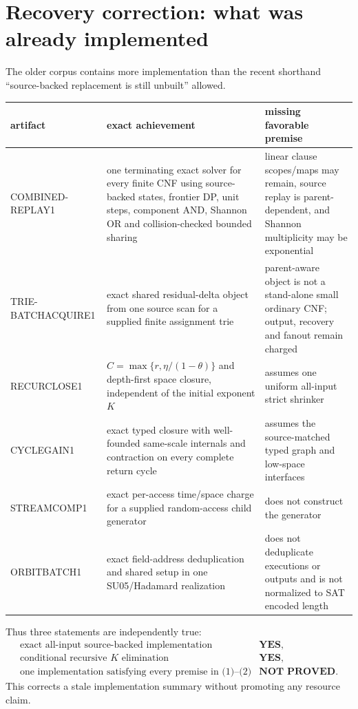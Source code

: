 \documentclass[11pt]{article}
\begin{document}
\section{Recovery correction: what was already implemented}
The older corpus contains more implementation than the recent shorthand
``source-backed replacement is still unbuilt'' allowed.

\begin{center}
\begin{tabular}{p{.25\linewidth}p{.31\linewidth}p{.35\linewidth}}
\toprule
artifact & exact achievement & missing favorable premise\\
\midrule
COMBINED-REPLAY1 & one terminating exact solver for every finite CNF using source-backed states, frontier DP, unit steps, component AND, Shannon OR and collision-checked bounded sharing & linear clause scopes/maps may remain, source replay is parent-dependent, and Shannon multiplicity may be exponential\\
TRIE-BATCHACQUIRE1 & exact shared residual-delta object from one source scan for a supplied finite assignment trie & parent-aware object is not a stand-alone small ordinary CNF; output, recovery and fanout remain charged\\
RECURCLOSE1 & $C=\max\{r,\eta/(1-\theta)\}$ and depth-first space closure, independent of the initial exponent $K$ & assumes one uniform all-input strict shrinker\\
CYCLEGAIN1 & exact typed closure with well-founded same-scale internals and contraction on every complete return cycle & assumes the source-matched typed graph and low-space interfaces\\
STREAMCOMP1 & exact per-access time/space charge for a supplied random-access child generator & does not construct the generator\\
ORBITBATCH1 & exact field-address deduplication and shared setup in one SU05/Hadamard realization & does not deduplicate executions or outputs and is not normalized to SAT encoded length\\
\bottomrule
\end{tabular}
\end{center}

Thus three statements are independently true:
\[
 \begin{array}{ll}
 \text{exact all-input source-backed implementation} & \textbf{YES},\\
 \text{conditional recursive $K$ elimination} & \textbf{YES},\\
 \text{one implementation satisfying every premise in (1)--(2)} & \textbf{NOT PROVED}.
 \end{array}                                               \tag{4}
\]
This corrects a stale implementation summary without promoting any resource
claim.
\end{document}
